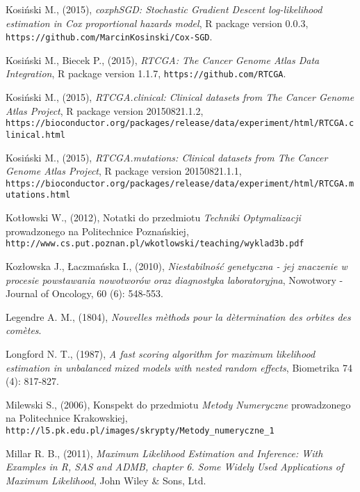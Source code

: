 \begin{thebibliography}{99}
 Kosiński M., (2015), \textit{coxphSGD: Stochastic Gradient Descent log-likelihood estimation in Cox proportional hazards model}, R package version 0.0.3,  \texttt{https://github.com/MarcinKosinski/Cox-SGD}.

 Kosiński M., Biecek P., (2015), \textit{RTCGA: The Cancer Genome Atlas Data Integration}, R package version 1.1.7, \texttt{https://github.com/RTCGA}.

 Kosiński M., (2015), \textit{RTCGA.clinical: Clinical datasets from The Cancer Genome Atlas Project}, R package version 20150821.1.2, \\ \texttt{https://bioconductor.org/packages/release/data/experiment/html/RTCGA.clinical.html}

 Kosiński M., (2015), \textit{RTCGA.mutations: Clinical datasets from The Cancer Genome Atlas Project}, R package version 20150821.1.1, \\ \texttt{https://bioconductor.org/packages/release/data/experiment/html/RTCGA.mutations.html}

 Kotłowski W., (2012), Notatki do przedmiotu \textit{Techniki Optymalizacji} prowadzonego na Politechnice Poznańskiej, \\ \texttt{http://www.cs.put.poznan.pl/wkotlowski/teaching/wyklad3b.pdf}

 Kozłowska J., Łaczmańska I., (2010), \textit{Niestabilność genetyczna - jej znaczenie w procesie powstawania nowotworów oraz diagnostyka laboratoryjna}, Nowotwory - Journal of Oncology, 60 (6): 548-553.

 Legendre A. M., (1804), \textit{Nouvelles m\`ethods pour la d\`etermination des orbites des com\`etes}.


 Longford N. T., (1987), \textit{A fast scoring algorithm for maximum likelihood estimation in unbalanced mixed models with nested random effects}, Biometrika 74 (4): 817-827.

 Milewski S., (2006), Konspekt do przedmiotu \textit{Metody Numeryczne} prowadzonego na Politechnice Krakowskiej, \\ \texttt{http://l5.pk.edu.pl/images/skrypty/Metody\_numeryczne\_1}

 Millar R. B., (2011), \textit{Maximum Likelihood Estimation and Inference: With Examples in R, SAS and ADMB, chapter 6. Some Widely Used Applications of Maximum Likelihood}, John Wiley \& Sons, Ltd.


\end{thebibliography}
